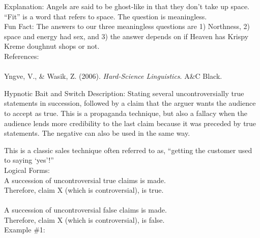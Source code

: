 \documentclass[a4paper,12pt,single,pdftex]{scrartcl}
\begin{document}
    
      Explanation: Angels are said to be ghost-like in that they don’t take up space. “Fit” is a word that refers to space. The question is meaningless.
    \\

    
      Fun Fact: The answers to our three meaningless questions are 1) Northness, 2) space and energy had sex, and 3) the answer depends on if Heaven has Krispy Kreme doughnut shops or not.
    \\

    
      References:
    \\

    
      
        
      \\

      
        
          Yngve, V., \& Wasik, Z. (2006). {\it Hard-Science Linguistics}. A\&C Black.
        
      
    
  

Hypnotic Bait and Switch
    Description: Stating several uncontroversially true statements in succession, followed by a claim that the arguer wants the audience to accept as true.  This is a propaganda technique, but also a fallacy when the audience lends more credibility to the last claim because it was preceded by true statements.  The negative can also be used in the same way.

    
      This is a classic sales technique often referred to as, “getting the customer used to saying ‘yes’!”
    \\

    
      Logical Forms:
    \\

    
      A succession of uncontroversial true claims is made.
    \\

    
      Therefore, claim X (which is controversial), is true.
    \\

    
       
    \\

    
      A succession of uncontroversial false claims is made.
    \\

    
      Therefore, claim X (which is controversial), is false.
    \\

    
      Example \#1:
    \\
\end{document}
